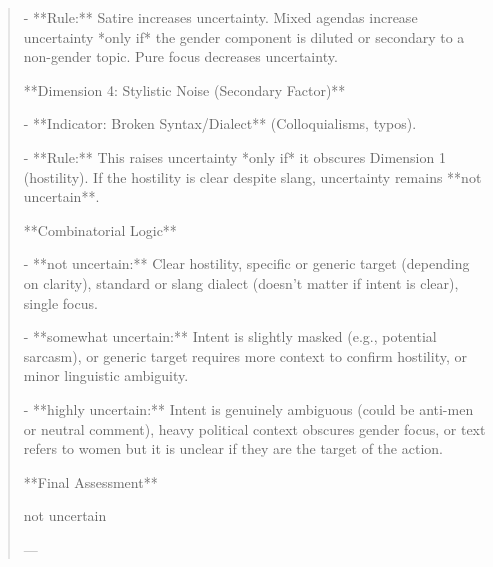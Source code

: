 \begin{quote}
- **Rule:** Satire increases uncertainty. Mixed agendas increase uncertainty *only if* the gender component is diluted or secondary to a non-gender topic. Pure focus decreases uncertainty.



**Dimension 4: Stylistic Noise (Secondary Factor)**

- **Indicator: Broken Syntax/Dialect** (Colloquialisms, typos).

- **Rule:** This raises uncertainty *only if* it obscures Dimension 1 (hostility). If the hostility is clear despite slang, uncertainty remains **not uncertain**.



**Combinatorial Logic**

- **not uncertain:** Clear hostility, specific or generic target (depending on clarity), standard or slang dialect (doesn't matter if intent is clear), single focus.

- **somewhat uncertain:** Intent is slightly masked (e.g., potential sarcasm), or generic target requires more context to confirm hostility, or minor linguistic ambiguity.

- **highly uncertain:** Intent is genuinely ambiguous (could be anti-men or neutral comment), heavy political context obscures gender focus, or text refers to women but it is unclear if they are the target of the action.



**Final Assessment**

not uncertain

---
\end{quote}
